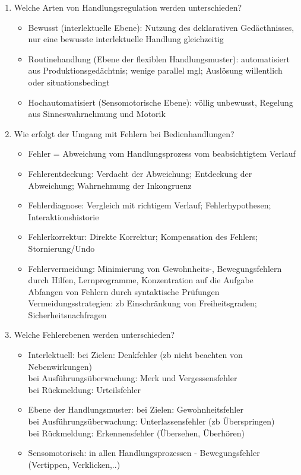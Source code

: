 \begin{enumerate}
	\item Welche Arten von Handlungsregulation werden unterschieden?
	\begin{itemize}
		\item Bewusst (interlektuelle Ebene): Nutzung des deklarativen Gedäcthnisses, nur eine bewusste interlektuelle Handlung gleichzeitig
		\item Routinehandlung (Ebene der flexiblen Handlungsmuster): automatisiert aus Produktionsgedächtnis; wenige parallel mgl; Auslösung willentlich oder situationsbedingt
		\item Hochautomatisiert (Sensomotorische Ebene): völlig unbewusst, Regelung aus Sinneswahrnehmung und Motorik
	\end{itemize}
	
	\item Wie erfolgt der Umgang mit Fehlern bei Bedienhandlungen?
	\begin{itemize}
		\item Fehler = Abweichung vom Handlungsprozess vom beabsichtigtem Verlauf
		\item Fehlerentdeckung: Verdacht der Abweichung; Entdeckung der Abweichung; Wahrnehmung der Inkongruenz
		\item Fehlerdiagnose: Vergleich mit richtigem Verlauf; Fehlerhypothesen; Interaktionshistorie
		\item Fehlerkorrektur: Direkte Korrektur; Kompensation des Fehlers; Stornierung/Undo
		\item Fehlervermeidung: Minimierung von Gewohnheits-, Bewegungsfehlern durch Hilfen, Lernprogramme, Konzentration auf die Aufgabe\\
		Abfangen von Fehlern durch syntaktische Prüfungen\\
		Vermeidungsstrategien: zb Einschränkung von Freiheitsgraden; Sicherheitsnachfragen
	\end{itemize}
	
	\item Welche Fehlerebenen werden unterschieden?
	\begin{itemize}
		\item Interlektuell: bei Zielen: Denkfehler (zb nicht beachten von Nebenwirkungen)\\
		bei Ausführungsüberwachung: Merk und Vergessensfehler\\
		bei Rückmeldung: Urteilsfehler
		\item Ebene der Handlungsmuster: bei Zielen: Gewohnheitsfehler\\
		bei Ausführungsüberwachung: Unterlassensfehler (zb Überspringen)\\
		bei Rückmeldung: Erkennensfehler (Übersehen, Überhören)
		\item Sensomotorisch: in allen Handlungsprozessen - Bewegungsfehler (Vertippen, Verklicken,..)
	\end{itemize}
	

\end{enumerate}
